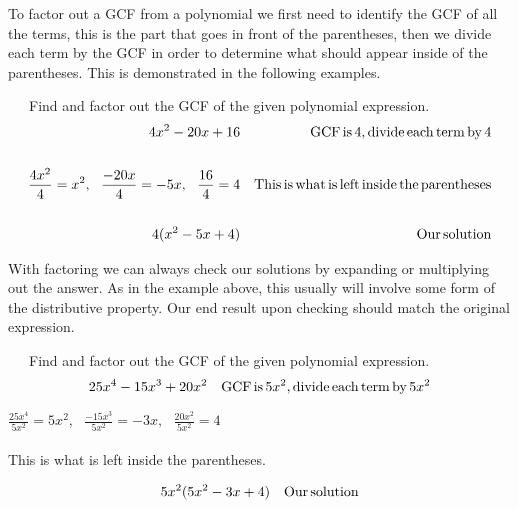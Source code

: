 To factor out a GCF from a polynomial we first need to identify the GCF of all
the terms, this is the part that goes in front of the parentheses, then we
divide each term by the GCF in order to determine what should appear inside of the
parentheses. This is demonstrated in the following examples.

\begin{example}~~~Find and factor out the GCF of the given polynomial expression.
  \begin{eqnarray*}
    4 x^2 - 20 x + 16 &  & \operatorname{GCF} \operatorname{is} 4, \operatorname{divide} \operatorname{each}
    \operatorname{term} \operatorname{by} 4\\
		&&\\
    \frac{4 x^2}{4} = x^2,~~ \frac{- 20 x}{4} = - 5 x,~~ \frac{16}{4} = 4 &  &
    \operatorname{This} \operatorname{is} \operatorname{what} \operatorname{is} \operatorname{left} \operatorname{inside}
    \operatorname{the} \operatorname{parentheses}\\
    &&\\
    4 (x^2 - 5 x + 4) &  & \operatorname{Our} \operatorname{solution}
  \end{eqnarray*}
\end{example}

With factoring we can always check our solutions by expanding or multiplying out the answer.  As in the example above, this usually will involve some form of the distributive property.  Our end result upon checking should match the original expression.

\begin{example}~~~Find and factor out the GCF of the given polynomial expression.
   \begin{eqnarray*}
    25 x^4 - 15 x^3 + 20 x^2 &  & \tmop{GCF} \tmop{is} 5 x^2, \tmop{divide}
    \tmop{each} \tmop{term} \tmop{by} 5x^2%
    \end{eqnarray*}
		\begin{center}
		$\displaystyle\frac{25 x^4}{5 x^2} = 5 x^2,~~~ \displaystyle\frac{- 15 x^3}{5 x^2} = - 3 x,~~~ \displaystyle\frac{20
    x^2}{5 x^2} = 4$\\
		~\\
		This is what is left inside the parentheses.
		\end{center}
    \begin{eqnarray*}
    5 x^2 (5 x^2 - 3 x + 4) &  & \operatorname{Our} \operatorname{solution}
  \end{eqnarray*}
\end{example}
  
	\newpage
	

